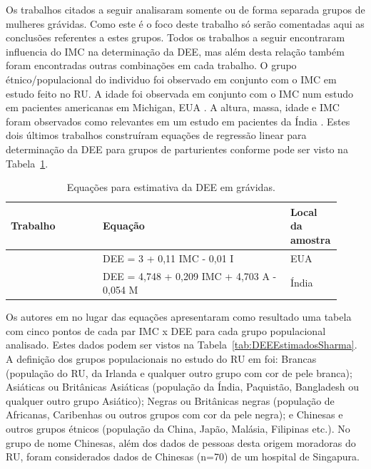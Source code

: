 Os trabalhos citados a seguir analisaram somente ou de forma separada grupos de mulheres grávidas. Como este é o foco deste trabalho só serão comentadas aqui as conclusões referentes a estes grupos. Todos os trabalhos a seguir encontraram influencia do \acrshort{IMC} na determinação da \acrshort{DEE}, mas além desta relação também foram encontradas outras combinações em cada trabalho. O grupo étnico/populacional do individuo foi observado em conjunto com o \acrshort{IMC} em \textcite{Sharma2011} estudo feito no \acrfull{RU}. A idade foi observada em conjunto com o \acrshort{IMC} num estudo em pacientes americanas em Michigan, EUA \cite{Clinkscales2007}. A altura, massa, idade e \acrshort{IMC} foram observados como relevantes em um estudo em pacientes da Índia \cite{Hazarika2016}. Estes dois últimos trabalhos construíram equações de regressão linear para determinação da \acrshort{DEE} para grupos de parturientes conforme pode ser visto na Tabela~\ref{tab:equacoesEstimativaDEE}.

\begin{table}[!ht]
\begin{center}
\caption{Equações para estimativa da DEE em grávidas.}
\label{tab:equacoesEstimativaDEE}
\begin{tabular}{|p{0.27\linewidth}|p{0.55\linewidth}|p{0.105\linewidth}|}
\hline
\textbf{Trabalho} & \textbf{Equação} & \textbf{Local da amostra}\\
\hline\hline
\cite{Clinkscales2007} & DEE = 3 + 0,11 IMC - 0,01 I & EUA \\
\cite{Hazarika2016} & DEE = 4,748 + 0,209 IMC + 4,703 A - 0,054 M & Índia \\
\hline
\end{tabular}
\end{center}
\end{table}

Os autores em \cite{Sharma2011} no lugar das equações apresentaram como resultado uma tabela com cinco pontos de cada par \acrshort{IMC} x \acrshort{DEE} para cada grupo populacional analisado. Estes dados podem ser vistos na Tabela~\ref{tab:DEEEstimadosSharma}. A definição dos grupos populacionais no estudo do \acrshort{RU} em \cite{Sharma2011} foi: Brancas (população do \acrlong{RU}, da Irlanda e qualquer outro grupo com cor de pele branca); Asiáticas ou Britânicas Asiáticas (população da Índia, Paquistão, Bangladesh ou qualquer outro grupo Asiático); Negras ou Britânicas negras (população de Africanas, Caribenhas ou outros grupos com cor da pele negra); e Chinesas e outros grupos étnicos (população da China, Japão, Malásia, Filipinas etc.). No grupo de nome Chinesas, além dos dados de pessoas desta origem moradoras do \acrshort{RU}, foram considerados dados de Chinesas (n=70) de um hospital de Singapura.

